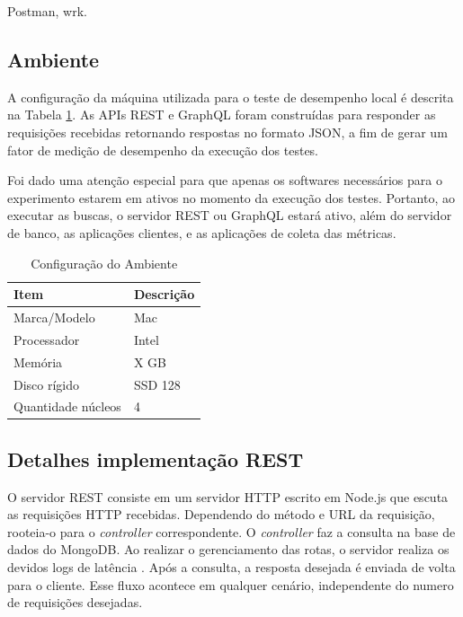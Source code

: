 Postman, wrk.


\subsection{Ambiente}

A configuração da máquina utilizada para o teste de desempenho local é descrita na Tabela \ref{tab:host}. As APIs REST e GraphQL foram construídas para responder as requisições recebidas retornando respostas no formato JSON, a fim de gerar um fator de medição de desempenho da execução dos testes.

Foi dado uma atenção especial para que apenas os softwares necessários para o experimento estarem em ativos no momento da execução dos testes. Portanto, ao executar as buscas, o servidor REST ou GraphQL estará ativo, além do servidor de banco, as aplicações clientes, e as aplicações de coleta das métricas.

\begin{table}
    \centering
    \begin{tabular}{| l | l |}
        \hline
        \textbf{Item} & \textbf{Descrição} \\ \hline
        Marca/Modelo & Mac \\ \hline
        Processador & Intel \\ \hline
        Memória &  X GB  \\ \hline
        Disco rígido & SSD 128  \\ \hline
        Quantidade núcleos & 4  \\ \hline
    \end{tabular}
    \caption{Configuração do Ambiente} \label{tab:host}
\end{table}

\subsection{Detalhes implementação REST}

O servidor REST consiste em um servidor HTTP escrito em Node.js que escuta as requisições HTTP recebidas. Dependendo do método e URL da requisição, rooteia-o para o \textit{controller} correspondente. O \textit{controller} faz a consulta na base de dados do MongoDB. Ao realizar o gerenciamento das rotas, o servidor realiza os devidos logs de latência . Após a consulta, a resposta desejada é enviada de volta para o cliente. Esse fluxo acontece em qualquer cenário, independente do numero de requisições desejadas.

